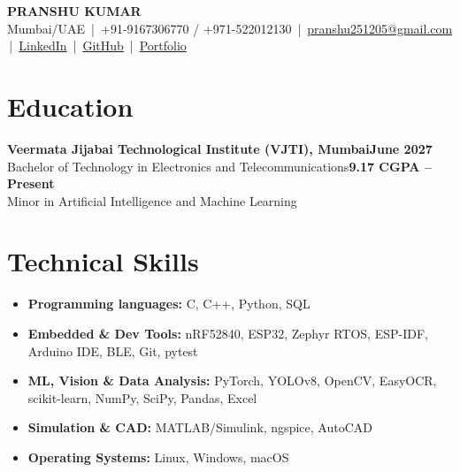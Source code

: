 \documentclass[10pt,letterpaper]{article}
\newcommand{\lnk}[2]{\href{#1}{\textcolor{linkblue}{#2}}}
\begin{document}
\begin{center}
{\Large\textbf{PRANSHU KUMAR}}\\[2pt]
Mumbai/UAE \,|\, +91-9167306770 / +971-522012130 \,|\, \lnk{mailto:pranshu251205@gmail.com}{pranshu251205@gmail.com} \,|\, \lnk{https://www.linkedin.com/in/notpranshu/}{LinkedIn} \,|\, \lnk{https://github.com/sudo-pranshu}{GitHub} \,|\, \lnk{https://portfoliopranshukumar.vercel.app}{Portfolio}
\end{center}
\vspace{-8pt}

\section{Education}
\textbf{Veermata Jijabai Technological Institute (VJTI), Mumbai}\hfill\textbf{June 2027}\\
Bachelor of Technology in Electronics and Telecommunications\hfill\textbf{9.17 CGPA -- Present}\\
Minor in Artificial Intelligence and Machine Learning

\section{Technical Skills}
\begin{itemize}
\item \textbf{Programming languages:} C, C++, Python, SQL
\item \textbf{Embedded \& Dev Tools:} nRF52840, ESP32, Zephyr RTOS, ESP-IDF, Arduino IDE, BLE, Git, pytest
\item \textbf{ML, Vision \& Data Analysis:} PyTorch, YOLOv8, OpenCV, EasyOCR, scikit-learn, NumPy, SciPy, Pandas, Excel
\item \textbf{Simulation \& CAD:} MATLAB/Simulink, ngspice, AutoCAD
\item \textbf{Operating Systems:} Linux, Windows, macOS
\end{itemize}
\end{document}
